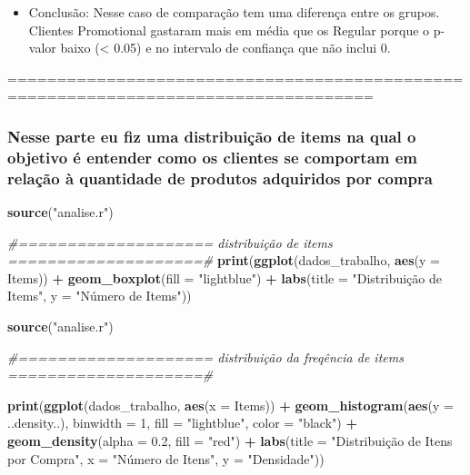 \documentclass[
]{article}
\newenvironment{Shaded}{\begin{snugshade}}{\end{snugshade}}
\newcommand{\AttributeTok}[1]{\textcolor[rgb]{0.13,0.29,0.53}{#1}}
\newcommand{\CommentTok}[1]{\textcolor[rgb]{0.56,0.35,0.01}{\textit{#1}}}
\newcommand{\DecValTok}[1]{\textcolor[rgb]{0.00,0.00,0.81}{#1}}
\newcommand{\FloatTok}[1]{\textcolor[rgb]{0.00,0.00,0.81}{#1}}
\newcommand{\FunctionTok}[1]{\textcolor[rgb]{0.13,0.29,0.53}{\textbf{#1}}}
\newcommand{\NormalTok}[1]{#1}
\newcommand{\SpecialCharTok}[1]{\textcolor[rgb]{0.81,0.36,0.00}{\textbf{#1}}}
\newcommand{\StringTok}[1]{\textcolor[rgb]{0.31,0.60,0.02}{#1}}
\providecommand{\tightlist}{%
  \setlength{\itemsep}{0pt}\setlength{\parskip}{0pt}}
\begin{document}
\begin{itemize}
\tightlist
\item
  Conclusão: Nesse caso de comparação tem uma diferença entre os grupos.
  Clientes Promotional gastaram mais em média que os Regular porque o
  p-valor baixo (\textless{} 0.05) e no intervalo de confiança que não
  inclui 0.
\end{itemize}

===================================================================================

\subsubsection{Nesse parte eu fiz uma distribuição de items na qual o
objetivo é entender como os clientes se comportam em relação à
quantidade de produtos adquiridos por
compra}\label{nesse-parte-eu-fiz-uma-distribuiuxe7uxe3o-de-items-na-qual-o-objetivo-uxe9-entender-como-os-clientes-se-comportam-em-relauxe7uxe3o-uxe0-quantidade-de-produtos-adquiridos-por-compra}

\begin{Shaded}
\begin{Highlighting}[]
\FunctionTok{source}\NormalTok{(}\StringTok{"analise.r"}\NormalTok{)}


\CommentTok{\#==================== distribuição de items ====================\#}
\FunctionTok{print}\NormalTok{(}\FunctionTok{ggplot}\NormalTok{(dados\_trabalho, }\FunctionTok{aes}\NormalTok{(}\AttributeTok{y =}\NormalTok{ Items)) }\SpecialCharTok{+}
  \FunctionTok{geom\_boxplot}\NormalTok{(}\AttributeTok{fill =} \StringTok{"lightblue"}\NormalTok{) }\SpecialCharTok{+}
  \FunctionTok{labs}\NormalTok{(}\AttributeTok{title =} \StringTok{"Distribuição de Items"}\NormalTok{, }\AttributeTok{y =} \StringTok{"Número de Items"}\NormalTok{))}

\FunctionTok{source}\NormalTok{(}\StringTok{"analise.r"}\NormalTok{)}

\CommentTok{\#==================== distribuição da freqência de items ====================\#}

\FunctionTok{print}\NormalTok{(}\FunctionTok{ggplot}\NormalTok{(dados\_trabalho, }\FunctionTok{aes}\NormalTok{(}\AttributeTok{x =}\NormalTok{ Items)) }\SpecialCharTok{+}
  \FunctionTok{geom\_histogram}\NormalTok{(}\FunctionTok{aes}\NormalTok{(}\AttributeTok{y =}\NormalTok{ ..density..), }\AttributeTok{binwidth =} \DecValTok{1}\NormalTok{, }\AttributeTok{fill =} \StringTok{"lightblue"}\NormalTok{, }\AttributeTok{color =} \StringTok{"black"}\NormalTok{) }\SpecialCharTok{+}
  \FunctionTok{geom\_density}\NormalTok{(}\AttributeTok{alpha =} \FloatTok{0.2}\NormalTok{, }\AttributeTok{fill =} \StringTok{"red"}\NormalTok{) }\SpecialCharTok{+}
  \FunctionTok{labs}\NormalTok{(}\AttributeTok{title =} \StringTok{"Distribuição de Itens por Compra"}\NormalTok{, }\AttributeTok{x =} \StringTok{"Número de Itens"}\NormalTok{, }\AttributeTok{y =} \StringTok{"Densidade"}\NormalTok{))}
\end{Highlighting}
\end{Shaded}
\end{document}
